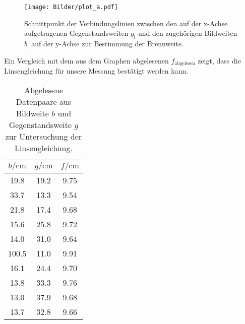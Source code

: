 \begin{figure}
  \centering
  \texttt{[image: Bilder/plot\_a.pdf]}
  \caption{Schnittpunkt der Verbindungslinien zwischen den auf der x-Achse aufgetragenen Gegenstandsweiten $g_\mathrm{i}$ und den zugehörigen Bildweiten $b_\mathrm{i}$ auf der y-Achse zur Bestimmung der Brennweite.}
  \label{fig:plota}
\end{figure}
Ein Vergleich mit dem aus dem Graphen abgelesenen $f_{\mathrm{abgelesen}}$ zeigt, dass die Linsengleichung für unsere Messung bestätigt werden kann.


\begin{table}
  \caption{Abgelesene Datenpaare aus Bildweite $b$ und Gegenstandsweite $g$ zur Untersuchung der Linsengleichung.}
  \label{tab:bundg}
  \centering
  \begin{tabular}{ccc}
    \toprule
  $b/\si{\centi\meter}$ & $g/\si{\centi\meter}$ & $f/\si{\centi\meter}$ \\
\midrule
  19.8 & 19.2 & 9.75 \\
  33.7 & 13.3 & 9.54 \\
  21.8 & 17.4 & 9.68 \\
  15.6 & 25.8 & 9.72 \\
  14.0 & 31.0 & 9.64 \\
  100.5 & 11.0 & 9.91 \\
  16.1 & 24.4 & 9.70 \\
  13.8 & 33.3 & 9.76 \\
  13.0 & 37.9 & 9.68 \\
  13.7 & 32.8 & 9.66 \\
\bottomrule
\end{tabular}
\end{table}



\FloatBarrier


